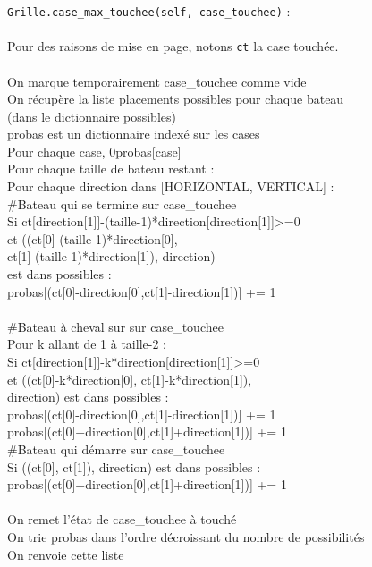 {
\begin{frame}[allowframebreaks]
\texttt{Grille.case\_max\_touchee(self, case\_touchee)} :\\~\\

Pour des raisons de mise en page, notons \texttt{ct} la case touchée.\\~\\
On marque temporairement case\_touchee comme vide\\ 
On récupère la liste placements possibles pour chaque bateau\\
 (dans le dictionnaire possibles)\\
probas est un dictionnaire indexé sur les cases\\
Pour chaque case, 0\sto probas[case]\\
\framebreak
Pour chaque taille de bateau restant :\\
Pour chaque direction dans [HORIZONTAL, VERTICAL] :\\
\#Bateau qui se termine sur case\_touchee\\
Si ct[direction[1]]-(taille-1)*direction[direction[1]]>=0\\
et ((ct[0]-(taille-1)*direction[0],\\ 
ct[1]-(taille-1)*direction[1]), direction)\\
est dans possibles :\\
probas[(ct[0]-direction[0],ct[1]-direction[1])] += 1\\~\\
\#Bateau à cheval sur sur case\_touchee\\
Pour k allant de 1 à taille-2 :\\
Si ct[direction[1]]-k*direction[direction[1]]>=0\\
et ((ct[0]-k*direction[0], ct[1]-k*direction[1]),\\
 direction) est dans possibles :\\
probas[(ct[0]-direction[0],ct[1]-direction[1])] += 1\\
probas[(ct[0]+direction[0],ct[1]+direction[1])] += 1\\
\framebreak
{}\#Bateau qui démarre sur case\_touchee\\
Si ((ct[0], ct[1]), direction) est dans possibles :\\
probas[(ct[0]+direction[0],ct[1]+direction[1])] += 1\\~\\
On remet l'état de case\_touchee à touché\\
On trie probas dans l'ordre décroissant du nombre de possibilités\\
On renvoie cette liste\\
\end{frame}
}


